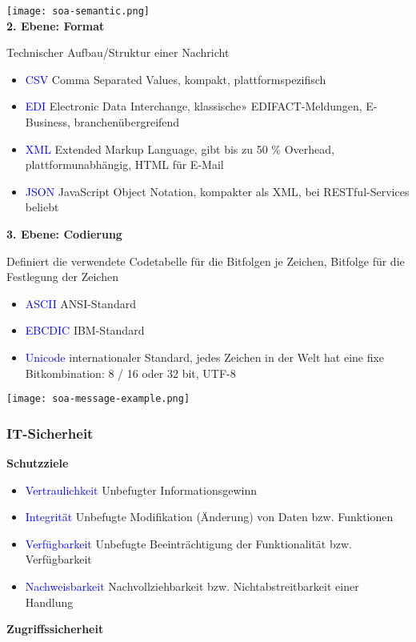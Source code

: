 \texttt{[image: soa-semantic.png]} \\


\textbf{2. Ebene: Format}

Technischer Aufbau/Struktur einer Nachricht

\begin{itemize}
    \item \textcolor{blue}{CSV} Comma Separated Values, kompakt, plattformspezifisch
    \item \textcolor{blue}{EDI} Electronic Data Interchange, klassische» EDIFACT-Meldungen, E-Business, branchenübergreifend
    \item \textcolor{blue}{XML} Extended Markup Language, gibt bis zu 50 \% Overhead, plattformunabhängig, HTML für E-Mail
    \item \textcolor{blue}{JSON} JavaScript Object Notation, kompakter als XML, bei RESTful-Services beliebt
\end{itemize}
\vspace{10pt}
\textbf{3. Ebene: Codierung}

Definiert die verwendete Codetabelle für die Bitfolgen je Zeichen, Bitfolge für die Festlegung der Zeichen

\begin{itemize}
    \item \textcolor{blue}{ASCII} ANSI-Standard
    \item \textcolor{blue}{EBCDIC} IBM-Standard
    \item \textcolor{blue}{Unicode} internationaler Standard, jedes Zeichen in der Welt hat eine fixe Bitkombination: 8 / 16 oder 32 bit, UTF-8
\end{itemize}

\texttt{[image: soa-message-example.png]}

\subsubsection{IT-Sicherheit}

\textbf{Schutzziele}

\begin{itemize}
    \item \textcolor{blue}{Vertraulichkeit} Unbefugter Informationsgewinn
    \item \textcolor{blue}{Integrität} Unbefugte Modifikation (Änderung) von Daten bzw. Funktionen
    \item \textcolor{blue}{Verfügbarkeit} Unbefugte Beeinträchtigung der Funktionalität bzw. Verfügbarkeit
    \item \textcolor{blue}{Nachweisbarkeit} Nachvollziehbarkeit bzw. Nichtabstreitbarkeit einer Handlung
\end{itemize}
\vspace{10pt}
\textbf{Zugriffssicherheit}

